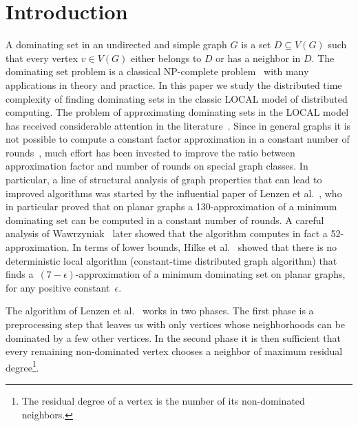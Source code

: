 \documentclass[a4paper,UKenglish,thm-restate,numberwithinsect]{lipics-v2021}
\begin{document}
\section{Introduction}
A dominating set in an undirected and simple graph $G$ is a set
$D\subseteq V(G)$ such that every vertex $v\in V(G)$ either belongs
to $D$ or has a neighbor in $D$. The dominating set problem is a
classical NP-complete problem~\cite{karp1972reducibility} with many
applications in theory and practice. In this paper we study
the distributed time complexity of finding
dominating sets in the classic LOCAL model of distributed computing.
The problem of approximating
dominating sets in the LOCAL model has received considerable
attention in the literature~\cite{akhoondian2018distributed,
akhoondian2016local,
alipour2020local,
amiri2016brief,
amiri2019distributed,
barenboim2018fast,
czygrinow2008fast,
czygrinow2018distributed,
DBLP:conf/stoc/GhaffariKM17,
hilke2014brief,
kublenz2020distributed,
KuhnMW16,
lenzen2013distributed,
lenzen2008leveraging,
lenzen2010minimum,
DBLP:conf/stoc/RozhonG20,
wawrzyniak2013brief,
wawrzyniak2014strengthened}. Since in general graphs
it is not possible to compute a
constant factor approximation in a constant number of rounds~\cite{KuhnMW16},
much effort has been invested to improve the ratio between approximation
factor and number of rounds on special graph classes. In particular, a
line of structural analysis of graph properties that can lead to improved
algorithms was started by the influential paper of Lenzen et al.~\cite{lenzen2013distributed}, who in particular proved that on planar graphs
a 130-approximation
of a minimum dominating set can be computed in a constant number of
rounds. A careful analysis of Wawrzyniak~\cite{wawrzyniak2014strengthened}
later showed that the algorithm computes in fact a 52-approximation.
In terms of lower bounds, Hilke et al.~\cite{hilke2014brief} showed that there is no
deterministic local algorithm (constant-time distributed graph algorithm) that
finds a~$(7-\epsilon)$-approximation of a minimum dominating set on
planar graphs, for any positive constant~$\epsilon$.

The algorithm of Lenzen et al.~\cite{lenzen2013distributed} works in two
phases. The first phase is a preprocessing step that leaves us with
only vertices whose neighborhoods can be dominated by a few other
vertices. In the second phase it is then sufficient that every remaining
non-dominated vertex chooses a neighbor of maximum residual
degree\footnote{The residual degree of a vertex is the number of
its non-dominated neighbors.}.
\end{document}
